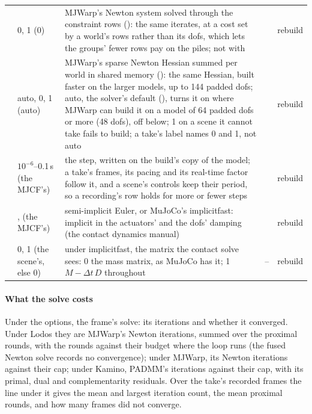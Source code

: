 \begin{longtable}{@{}L{29mm}L{26mm}L{62mm}L{11mm}L{16mm}@{}}
 & 0, 1 (0) & MJWarp's Newton system solved through the constraint rows (): the same iterates, at a cost set by a world's rows rather than its dofs, which lets the groups' fewer rows pay on the piles; not with  & \code{<>} & rebuild \\
 & auto, 0, 1 (auto) & MJWarp's sparse Newton Hessian summed per world in shared memory (): the same Hessian, built faster on the larger models, up to 144 padded dofs; auto, the solver's default (), turns it on where MJWarp can build it on a model of 64 padded dofs or more (48 dofs), off below; 1 on a scene it cannot take fails to build; a take's label names 0 and 1, not auto & \code{<>} & rebuild \\
 & $10^{-6}$--0.1\,s (the MJCF's) & the step, written on the build's copy of the model; a take's frames, its pacing and its real-time factor follow it, and a scene's controls keep their period, so a recording's row holds for more or fewer steps & \code{^} & rebuild \\
 & ,  (the MJCF's) & semi-implicit Euler, or MuJoCo's implicitfast: implicit in the actuators' and the dofs' damping (the contact dynamics manual) & \code{<>} & rebuild \\
 & 0, 1 (the scene's, else 0) & under implicitfast, the matrix the contact solve sees: 0 the mass matrix, as MuJoCo has it; 1 $M - \Delta t\,D$ throughout & -- & rebuild \\
\bottomrule
\end{longtable}
\endgroup

\paragraph{What the solve costs} Under the options, the frame's solve: its iterations and whether it converged. Under Lodos they are MJWarp's Newton iterations, summed over the proximal rounds, with the rounds against their budget where the loop runs (the fused Newton solve records no convergence); under MJWarp, its Newton iterations against their cap; under Kamino, PADMM's iterations against their cap, with its primal, dual and complementarity residuals. Over the take's recorded frames the line under it gives the mean and largest iteration count, the mean proximal rounds, and how many frames did not converge.

